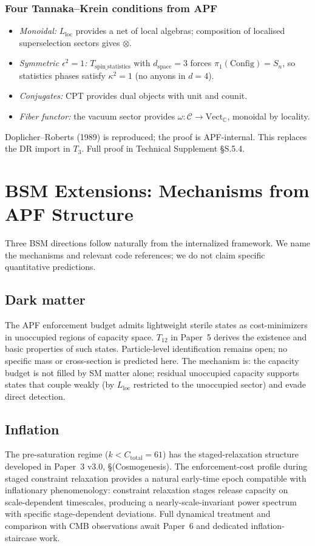 \documentclass[11pt]{article}
\theoremstyle{definition}
\begin{document}
\subsubsection*{Four Tannaka--Krein conditions from APF}
\begin{itemize}
\item[(TK1)] \emph{Monoidal:} $L_{\mathrm{loc}}$ provides a net of local algebras; composition of localised superselection sectors gives $\otimes$.
\item[(TK2)] \emph{Symmetric $\epsilon^2 = 1$:} $T_{\mathrm{spin\_statistics}}$ with $d_{\mathrm{space}} = 3$ forces $\pi_1(\mathrm{Config}) = S_n$, so statistics phases satisfy $\kappa^2 = 1$ (no anyons in $d = 4$).
\item[(TK3)] \emph{Conjugates:} CPT provides dual objects with unit and counit.
\item[(TK4)] \emph{Fiber functor:} the vacuum sector provides $\omega : \mathcal{C} \to \mathrm{Vect}_\mathbb{C}$, monoidal by locality.
\end{itemize}
Doplicher--Roberts (1989) is reproduced; the proof is APF-internal.  This replaces the DR import in $T_3$.  Full proof in Technical Supplement \S S.5.4.

\section{BSM Extensions: Mechanisms from APF Structure}\label{sec:bsm}
Three BSM directions follow naturally from the internalized framework.  We name the mechanisms and relevant code references; we do not claim specific quantitative predictions.

\subsection{Dark matter}
The APF enforcement budget admits lightweight sterile states as cost-minimizers in unoccupied regions of capacity space.  $T_{12}$ in Paper~5 derives the existence and basic properties of such states.  Particle-level identification remains open; no specific mass or cross-section is predicted here.  The mechanism is: the capacity budget is not filled by SM matter alone; residual unoccupied capacity supports states that couple weakly (by $L_{\mathrm{loc}}$ restricted to the unoccupied sector) and evade direct detection.

\subsection{Inflation}
The pre-saturation regime ($k < C_{\mathrm{total}} = 61$) has the staged-relaxation structure developed in Paper~3 v3.0, \S (Cosmogenesis).  The enforcement-cost profile during staged constraint relaxation provides a natural early-time epoch compatible with inflationary phenomenology: constraint relaxation stages release capacity on scale-dependent timescales, producing a nearly-scale-invariant power spectrum with specific stage-dependent deviations.  Full dynamical treatment and comparison with CMB observations await Paper~6 and dedicated inflation-staircase work.
\end{document}
